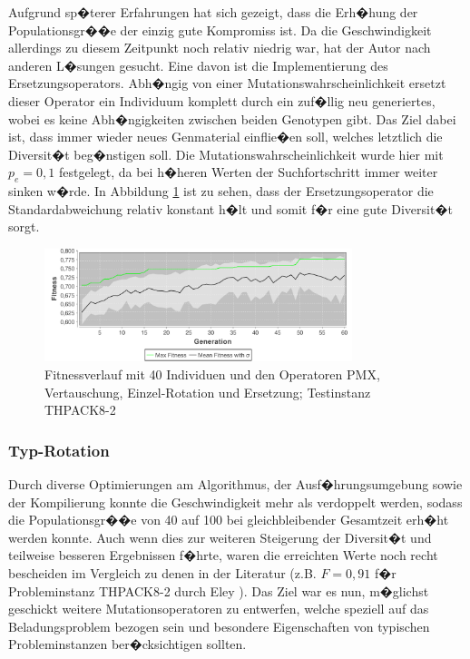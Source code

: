 \documentclass[a4paper,abstracton,12pt]{scrartcl}
\begin{document}
Aufgrund sp�terer Erfahrungen hat sich gezeigt, dass die Erh�hung der Populationsgr��e der einzig gute Kompromiss ist. Da die Geschwindigkeit allerdings zu diesem Zeitpunkt noch relativ niedrig war, hat der Autor nach anderen L�sungen gesucht. Eine davon ist die Implementierung des Ersetzungsoperators. Abh�ngig von einer Mutationswahrscheinlichkeit ersetzt dieser Operator ein Individuum komplett durch ein zuf�llig neu generiertes, wobei es keine Abh�ngigkeiten zwischen beiden Genotypen gibt. Das Ziel dabei ist, dass immer wieder neues Genmaterial einflie�en soll, welches letztlich die Diversit�t beg�nstigen soll. Die Mutationswahrscheinlichkeit wurde hier mit $p_e = 0,1$ festgelegt, da bei h�heren Werten der Suchfortschritt immer weiter sinken w�rde. In Abbildung \ref{fig:thpack8-2_pmx,listmutation,rotation,replacement,pop40} ist zu sehen, dass der Ersetzungsoperator die Standardabweichung relativ konstant h�lt und somit f�r eine gute Diversit�t sorgt.

\begin{figure}
	\centering
		\includegraphics[width=0.80\textwidth]{imgs/thpack8-2_pmx,listmutation,rotation,replacement,pop40.pdf}
	\caption{Fitnessverlauf mit 40 Individuen und den Operatoren PMX, Vertauschung, Einzel-Rotation und Ersetzung; Testinstanz THPACK8-2}
	\label{fig:thpack8-2_pmx,listmutation,rotation,replacement,pop40}
\end{figure}

\subsubsection{Typ-Rotation}

Durch diverse Optimierungen am Algorithmus, der Ausf�hrungsumgebung sowie der Kompilierung konnte die Geschwindigkeit mehr als verdoppelt werden, sodass die Populationsgr��e von 40 auf 100 bei gleichbleibender Gesamtzeit erh�ht werden konnte. Auch wenn dies zur weiteren Steigerung der Diversit�t und teilweise besseren Ergebnissen f�hrte, waren die erreichten Werte noch recht bescheiden im Vergleich zu denen in der Literatur (z.B. $F=0,91$ f�r Probleminstanz THPACK8-2 durch Eley \cite{eley2002}). Das Ziel war es nun, m�glichst geschickt weitere Mutationsoperatoren zu entwerfen, welche speziell auf das Beladungsproblem bezogen sein und besondere Eigenschaften von typischen Probleminstanzen ber�cksichtigen sollten.
\end{document}

